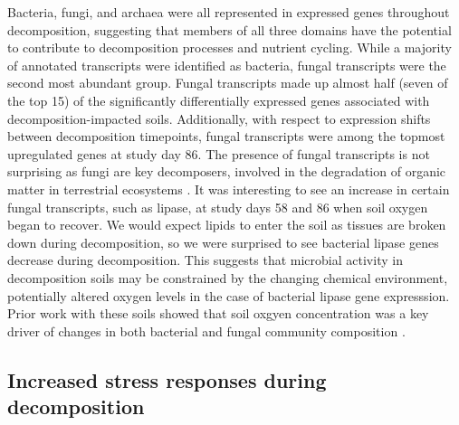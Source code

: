 \documentclass[
  sn-nature,
  lineno, referee]{sn-jnl}
\begin{document}
Bacteria, fungi, and archaea were all represented in expressed genes
throughout decomposition, suggesting that members of all three domains
have the potential to contribute to decomposition processes and nutrient
cycling. While a majority of annotated transcripts were identified as
bacteria, fungal transcripts were the second most abundant group. Fungal
transcripts made up almost half (seven of the top 15) of the
significantly differentially expressed genes associated with
decomposition-impacted soils. Additionally, with respect to expression
shifts between decomposition timepoints, fungal transcripts were among
the topmost upregulated genes at study day 86. The presence of fungal
transcripts is not surprising as fungi are key decomposers, involved in
the degradation of organic matter in terrestrial ecosystems
\citep{van_der_wal_thready_2013}. It was interesting to see an increase
in certain fungal transcripts, such as lipase, at study days 58 and 86
when soil oxygen began to recover. We would expect lipids to enter the
soil as tissues are broken down during decomposition, so we were
surprised to see bacterial lipase genes decrease during decomposition.
This suggests that microbial activity in decomposition soils may be
constrained by the changing chemical environment, potentially altered
oxygen levels in the case of bacterial lipase gene expresssion. Prior
work with these soils showed that soil oxgyen concentration was a key
driver of changes in both bacterial and fungal community composition
\citep{taylor_transient_2024}.

\subsection{Increased stress responses during
decomposition}\label{increased-stress-responses-during-decomposition}
\end{document}
